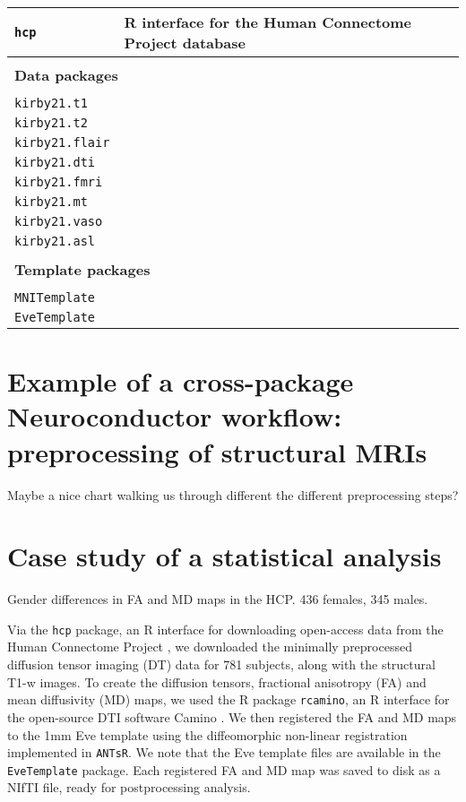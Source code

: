 \documentclass[]{elsarticle} %
\begin{document}
\begin{table}[!ht]
\begin{tabular}{lll}
\texttt{hcp} & R interface for the Human Connectome Project database &  \\
\hline \\ [-1.5ex]
\multicolumn{3}{l}{\textbf{Data packages}}\\
\\ [-1.5ex]
\texttt{kirby21.t1} &   & \citep{kirby}  \\
\texttt{kirby21.t2} &   &  \citep{kirby} \\
\texttt{kirby21.flair} &   &  \citep{kirby} \\
\texttt{kirby21.dti} &   &  \citep{kirby} \\
\texttt{kirby21.fmri} &   &  \citep{kirby} \\
\texttt{kirby21.mt} &   &  \citep{kirby} \\
\texttt{kirby21.vaso} &   &  \citep{kirby} \\
\texttt{kirby21.asl} &   &  \citep{kirby} \\
\hline \\ [-1.5ex]
\multicolumn{3}{l}{\textbf{Template packages}}\\
\\ [-1.5ex]
\texttt{MNITemplate} &   &   \\
\texttt{EveTemplate} &   & \citep{eve}  \\
\end{tabular}
\end{table}




\section{Example of a cross-package Neuroconductor workflow: preprocessing of structural MRIs}

Maybe a nice chart walking us through different the different preprocessing steps?

\section{Case study of a statistical analysis}

Gender differences in FA and MD maps in the HCP. 436 females, 345 males. 

Via the \texttt{hcp} package, an R interface for downloading open-access data from the Human Connectome Project \citep{hcp}, we downloaded the minimally preprocessed diffusion tensor imaging (DT) data \citep{hcpminimal} for 781 subjects, along with the structural T1-w images. To create the diffusion tensors, fractional anisotropy (FA) and mean diffusivity (MD) maps, we used the R package \texttt{rcamino}, an R interface for the open-source DTI software Camino \citep{camino}. We then registered the FA and MD maps to the 1mm Eve template \citep{eve} using the diffeomorphic non-linear registration implemented in \texttt{ANTsR}. We note that the Eve template files are available in the \texttt{EveTemplate} package. Each registered FA and MD map was saved to disk as a NIfTI file, ready for postprocessing analysis. 
\end{document}
